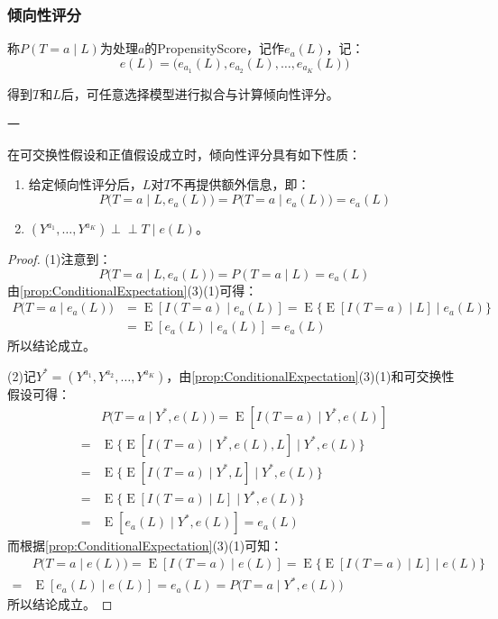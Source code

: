 \subsubsection{倾向性评分}
\begin{definition}
	称$P(T=a\mid L)$为处理$a$的\gls{PropensityScore}，记作$e_a(L)$，记：
	\begin{equation*}
		e(L)=\Big(e_{a_1}(L),e_{a_2}(L),\dots,e_{a_K}(L)\Big)
	\end{equation*}
\end{definition}
\begin{note}
	得到$T$和$L$后，可任意选择模型进行拟合与计算倾向性评分。
\end{note}
一
\begin{property}\label{prop:PropensityScore}
	在可交换性假设和正值假设成立时，倾向性评分具有如下性质：
	\begin{enumerate}
		\item 给定倾向性评分后，$L$对$T$不再提供额外信息，即：
		\begin{equation*}
			P\Big(T=a\mid L,e_a(L)\Big)=P\Big(T=a\mid e_a(L)\Big)=e_a(L)
		\end{equation*}
		\item $(Y^{a_1},\ldots,Y^{a_K})\perp\!\!\!\perp T\mid e(L)$。
	\end{enumerate}
\end{property}
\begin{proof}
	(1)注意到：
	\begin{equation*}
		P\Big(T=a\mid L,e_a(L)\Big)=P(T=a\mid L)=e_a(L)
	\end{equation*}
	由\cref{prop:ConditionalExpectation}(3)(1)可得：
	\begin{align*}
		P\Big(T=a\mid e_a(L)\Big)&=\operatorname{E}[I(T=a)\mid e_a(L)]=\operatorname{E}\{\operatorname{E}[I(T=a)\mid L]\mid e_a(L)\} \\
		&=\operatorname{E}[e_a(L)\mid e_a(L)]=e_a(L)
	\end{align*}
	所以结论成立。\par
	(2)记$Y^*=(Y^{a_1},Y^{a_2},\dots,Y^{a_K})$，由\cref{prop:ConditionalExpectation}(3)(1)和可交换性假设可得：
	\begin{align*}
		&P\Big(T=a\mid Y^*,e(L)\Big)=\operatorname{E}[I(T=a)\mid Y^*,e(L)] \\
		=&\operatorname{E}\{\operatorname{E}[I(T=a)\mid Y^*,e(L),L]\mid Y^*,e(L)\} \\
		=&\operatorname{E}\{\operatorname{E}[I(T=a)\mid Y^*,L]\mid Y^*,e(L)\} \\
		=&\operatorname{E}\{\operatorname{E}[I(T=a)\mid L]\mid Y^*,e(L)\} \\
		=&\operatorname{E}[e_a(L)\mid Y^*,e(L)]=e_a(L)
	\end{align*}
	而根据\cref{prop:ConditionalExpectation}(3)(1)可知：
	\begin{align*}
		&P\Big(T=a\mid e(L)\Big)=\operatorname{E}[I(T=a)\mid e(L)]=\operatorname{E}\{\operatorname{E}[I(T=a)\mid L]\mid e(L)\} \\
		=&\operatorname{E}[e_a(L)\mid e(L)]=e_a(L)=P\Big(T=a\mid Y^*,e(L)\Big)
	\end{align*}
	所以结论成立。
\end{proof}
